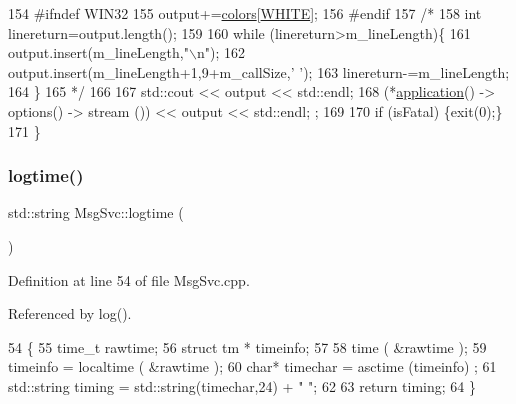 \begin{DoxyCode}
154 \textcolor{preprocessor}{#ifndef WIN32}
155   output+=\hyperlink{classMsgSvc_abcd0a0eab83f97f7638bbcca4f69e950}{colors}[\hyperlink{classMsgSvc_af95de99b5b2e7b6754b6d94ec5526d2ca7eb16ade63c14f1eca4a79c0d3316b1e}{WHITE}];
156 \textcolor{preprocessor}{#endif}
157   \textcolor{comment}{/*}
158 \textcolor{comment}{    int linereturn=output.length();}
159 \textcolor{comment}{}
160 \textcolor{comment}{    while (linereturn>m\_lineLength)\{}
161 \textcolor{comment}{    output.insert(m\_lineLength,"\(\backslash\)n");}
162 \textcolor{comment}{    output.insert(m\_lineLength+1,9+m\_callSize,' ');}
163 \textcolor{comment}{    linereturn-=m\_lineLength;   }
164 \textcolor{comment}{    \}}
165 \textcolor{comment}{  */}
166   
167   std::cout << output << std::endl;
168   (*\hyperlink{Tools_8h_a27885a3c35afe79029fb830f32f66458}{application}() -> options() -> stream ()) << output << std::endl; ;
169 
170   \textcolor{keywordflow}{if} (isFatal) \{exit(0);\}
171 \}
\end{DoxyCode}
\mbox{\label{classMsgSvc_a74b20f11493ffbe27801bc1857fd079e}} 
\subsubsection{\texorpdfstring{logtime()}{logtime()}}
{\footnotesize\ttfamily std\+::string Msg\+Svc\+::logtime (\begin{DoxyParamCaption}{ }\end{DoxyParamCaption})\hspace{0.3cm}{\ttfamily [private]}}



Definition at line 54 of file Msg\+Svc.\+cpp.



Referenced by log().


\begin{DoxyCode}
54                          \{
55   time\_t rawtime;
56   \textcolor{keyword}{struct }tm * timeinfo;
57   
58   time ( &rawtime );
59   timeinfo = localtime ( &rawtime );
60   \textcolor{keywordtype}{char}* timechar =  asctime (timeinfo) ;
61   std::string timing = std::string(timechar,24) + \textcolor{stringliteral}{" "};
62 
63   \textcolor{keywordflow}{return} timing;
64 \}
\end{DoxyCode}
\mbox{\label{classMsgSvc_ad25f18047920cc59a314e5098259711c}} 
